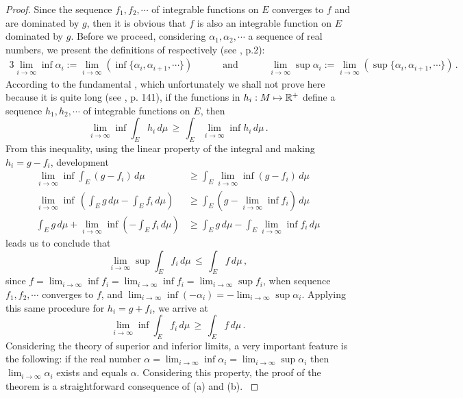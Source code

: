 \begin{proof}
{\footnotesize
Since the sequence $f_1,f_2,\cdots$ of integrable functions on $E$ converges to $f$ and are dominated by $g$, then it is obvious that $f$ is also an integrable function on $E$ dominated by $g$. Before we proceed, considering $\alpha_1,\alpha_2,\cdots$ a sequence of real numbers, we present the definitions of  respectively (see \cite{friedman_1982_1}, p.2): 
\begin{alignat*} {3}
\lim_{i\to\infty}\inf \alpha_i:=\lim_{i\to\infty}(\inf \{\alpha_i,\alpha_{i+1},\cdots\})&\qquad \text{ and } \qquad&\lim_{i\to\infty}\sup \alpha_i:=\lim_{i\to\infty}(\sup \{\alpha_i,\alpha_{i+1},\cdots\})\,.
\end{alignat*} 
According to the fundamental , which unfortunately we shall not prove here because it is quite long (see \cite{lang_1993_3}, p. 141), if the functions in $h_i : M \mapsto \mathbb{R}^+$ define a sequence $h_1,h_2,\cdots$ of integrable functions on $E$, then 
\begin{equation*}
\lim_{i\to\infty}\inf  \int_E h_i\, d\mu\,\geqslant\,  \int_E \lim_{i\to\infty}\inf h_i\, d\mu\,.
\end{equation*}
From this inequality, using the linear property of the integral and making $h_i=g-f_i$, development
\begin{align*}
\lim_{i\to\infty}\inf  \int_E (g-f_i)\, d\mu &\geqslant   \int_E \lim_{i\to\infty}\inf (g-f_i)\, d\mu\\
\lim_{i\to\infty}\inf \,(\int_E g\, d\mu-\int_E f_i\, d\mu)&\geqslant\int_E (g-\lim_{i\to\infty}\inf f_i)\, d\mu\\
\int_E g\, d\mu + \lim_{i\to\infty}\inf (-\int_E f_i\, d\mu)&\geqslant\int_E g\, d\mu - \int_E \lim_{i\to\infty}\inf f_i \, d\mu
\end{align*}
leads us to conclude that 
\begin{equation}
\tag{a}
\lim_{i\to\infty}\sup \int_E f_i\, d\mu\, \leqslant\, \int_E f\, d\mu\,,
\end{equation}
since $f=\lim_{i\to\infty}\inf f_i=\lim_{i\to\infty}\inf f_i=\lim_{i\to\infty}\sup f_i$, when sequence $f_1,f_2,\cdots$ converges to $f$, and $\lim_{i\to\infty}\inf (-\alpha_i)=-\lim_{i\to\infty}\sup \alpha_i$. Applying this same procedure for $h_i=g+f_i$, we arrive at 
\begin{equation}
\tag{b}
\lim_{i\to\infty}\inf \int_E f_i\, d\mu\, \geqslant\, \int_E f\, d\mu\,.
\end{equation}
Considering the theory of superior and inferior limits, a very important feature is the following: if the real number $\alpha=\lim_{i\to\infty}\inf \alpha_i=\lim_{i\to\infty}\sup \alpha_i$ then $\lim_{i\to\infty} \alpha_i$ exists and equals $\alpha$. Considering this property, the proof of the theorem is a straightforward consequence of (a) and (b). 
}
\end{proof}

